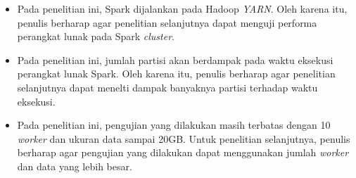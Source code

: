 \begin{itemize}

\item Pada penelitian ini, Spark dijalankan pada Hadoop \textit{YARN}. Oleh karena itu, penulis berharap agar penelitian selanjutnya dapat menguji performa perangkat lunak pada Spark \textit{cluster}.

\item Pada penelitian ini, jumlah partisi akan berdampak pada waktu eksekusi perangkat lunak Spark. Oleh karena itu, penulis berharap agar penelitian selanjutnya dapat menelti dampak banyaknya partisi terhadap waktu eksekusi.

\item Pada penelitian ini, pengujian yang dilakukan masih terbatas dengan 10 \textit{worker} dan ukuran data sampai 20GB. Untuk penelitian selanjutnya, penulis berharap agar pengujian yang dilakukan dapat menggunakan jumlah \textit{worker} dan data yang lebih besar.
\end{itemize}